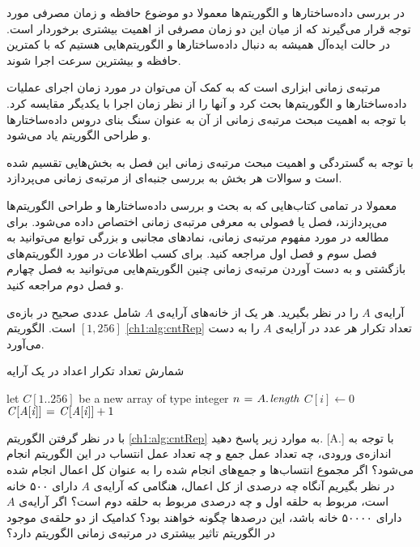 در بررسی داده‌ساختارها و الگوریتم‌ها معمولا دو موضوع حافظه‌ و زمان مصرفی مورد توجه قرار می‌گیرند که از میان این دو زمان مصرفی از اهمیت بیشتری برخوردار است. در حالت ایده‌آل همیشه به دنبال داده‌ساختارها و الگوریتم‌هایی هستیم که با کمترین حافظه و بیشترین سرعت اجرا شوند.

مرتبه‌ی زمانی ابزاری است که به کمک آن می‌توان در مورد زمان اجرای عملیات داده‌ساختارها و الگوریتم‌ها بحث کرد و آنها را از نظر زمان اجرا با یکدیگر مقایسه کرد. با توجه به اهمیت مبحث مرتبه‌ی زمانی از آن به عنوان سنگ بنای دروس داده‌ساختارها و طراحی الگوریتم یاد می‌شود.

با توجه به گستردگی و اهمیت مبحث مرتبه‌ی زمانی این فصل به بخش‌هایی تقسیم شده است و سوالات هر بخش به بررسی جنبه‌ای از مرتبه‌ی زمانی می‌پردازد.

معمولا در تمامی کتاب‌هایی که به بحث و بررسی داده‌ساختارها و طراحی الگوریتم‌ها می‌پردازند، فصل یا فصولی به معرفی مرتبه‌ی زمانی اختصاص داده می‌شود. برای مطالعه در مورد مفهوم مرتبه‌ی زمانی، نمادهای مجانبی و بزرگی توابع می‌توانید به فصل سوم {\cite{clrs}} و فصل اول {\cite{ebrahimi}} مراجعه کنید. برای کسب اطلاعات در مورد الگوریتم‌های بازگشتی و به دست آوردن مرتبه‌ی زمانی چنین الگوریتم‌هایی می‌توانید به فصل چهارم {\cite{clrs}} و فصل دوم {\cite{ebrahimi}} مراجعه کنید.

 آرایه‌ی‌‌ {$A$} را در نظر بگیرید. هر یک از خانه‌ها‌ی آرایه‌ی {$A$} شامل عددی صحیح در بازه‌ی {$[1,256]$} است. الگوریتم {\eqref{ch1:alg:cntRep}} تعداد تکرار هر عدد در آرایه‌‌ی {$A$} را به دست می‌آورد.

\begin{algorithm}
\caption{شمارش تعداد تکرار اعداد در یک آرایه}\label{ch1:alg:cntRep}
\begin{latin}
\begin{algorithmic}[1]
	\State let $C[1..256]$ be a new array of type integer
	\State $n \mathrel{\hspace{1pt}=\hspace{1pt}} A.\hspace*{1pt}\mathit{length}$
		\State $C[i] \gets 0$
	\EndFor
			\State $\mathit{C[A[i]]} \mathrel{\hspace{1pt}=\hspace{1pt}} \mathit{C[A[i]]}+1$
	\EndFor	
\EndProcedure
\end{algorithmic}
\end{latin}
\end{algorithm}

با در نظر گرفتن الگوریتم {\eqref{ch1:alg:cntRep}} به موارد زیر پاسخ دهید.
[A.]
 با توجه به اندازه‌ی ورودی، چه تعداد عمل جمع و چه تعداد عمل انتساب در این الگوریتم انجام می‌شود؟ 
 اگر مجموع انتساب‌ها و جمع‌های انجام ‌شده را به عنوان کل اعمال انجام ‌شده در نظر بگیریم آنگاه چه درصدی از کل اعمال، هنگامی که آرایه‌ی {$A$} دارای ۵۰۰ خانه است، مربوط به حلقه اول و چه درصدی مربوط به حلقه دوم است؟ اگر آرایه‌ی {$A$} دارای ۵۰۰۰۰ خانه باشد، این درصدها چگونه خواهند بود؟
 کدامیک از دو حلقه‌ی موجود در الگوریتم تاثیر بیشتری در مرتبه‌ی زمانی الگوریتم دارد؟

